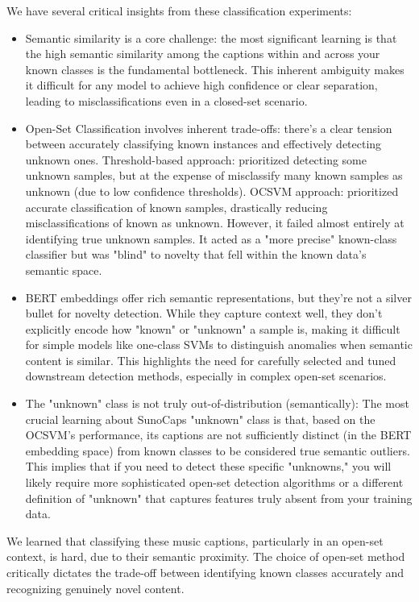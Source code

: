 \documentclass[conference]{IEEEtran}  %
\begin{document}
We have several critical insights from these classification experiments:
\begin{itemize}
    \item Semantic similarity is a core challenge: the most significant learning is that the high semantic similarity among the captions within and across your known classes is the fundamental bottleneck. This inherent ambiguity makes it difficult for any model to achieve high confidence or clear separation, leading to misclassifications even in a closed-set scenario.

    \item Open-Set Classification involves inherent trade-offs: there's a clear tension between accurately classifying known instances and effectively detecting unknown ones.
    Threshold-based approach: prioritized detecting some unknown samples, but at the expense of misclassify many known samples as unknown (due to low confidence thresholds). 
    OCSVM approach: prioritized accurate classification of known samples, drastically reducing misclassifications of known as unknown. However, it failed almost entirely at identifying true unknown samples. It acted as a "more precise" known-class classifier but was "blind" to novelty that fell within the known data's semantic space.

    \item BERT embeddings offer rich semantic representations, but they're not a silver bullet for novelty detection. While they capture context well, they don’t explicitly encode how "known" or "unknown" a sample is, making it difficult for simple models like one-class SVMs to distinguish anomalies when semantic content is similar. This highlights the need for carefully selected and tuned downstream detection methods, especially in complex open-set scenarios.

    \item The "unknown" class is not truly out-of-distribution (semantically): The most crucial learning about SunoCaps "unknown" class is that, based on the OCSVM's performance, its captions are not sufficiently distinct (in the BERT embedding space) from known classes to be considered true semantic outliers. This implies that if you need to detect these specific "unknowns," you will likely require more sophisticated open-set detection algorithms or a different definition of "unknown" that captures features truly absent from your training data.
\end{itemize}

We learned that classifying these music captions, particularly in an open-set context, is hard, due to their semantic proximity. The choice of open-set method critically dictates the trade-off between identifying known classes accurately and recognizing genuinely novel content.
\end{document}
